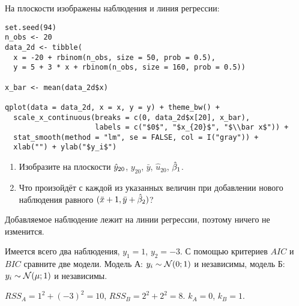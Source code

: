 \begin{problem}
На плоскости изображены наблюдения и линия регрессии:



\begin{verbatim}
set.seed(94)
n_obs <- 20
data_2d <- tibble(
  x = -20 + rbinom(n_obs, size = 50, prob = 0.5),
  y = 5 + 3 * x + rbinom(n_obs, size = 160, prob = 0.5))

x_bar <- mean(data_2d$x)

qplot(data = data_2d, x = x, y = y) + theme_bw() +
  scale_x_continuous(breaks = c(0, data_2d$x[20], x_bar),
                     labels = c("$0$", "$x_{20}$", "$\\bar x$")) +
  stat_smooth(method = "lm", se = FALSE, col = I("gray")) +
  xlab("") + ylab("$y_i$")
\end{verbatim}




\begin{minipage}{\textwidth}
\begin{tikzpicture}[scale = 0.025]

\end{tikzpicture}
\end{minipage}


\begin{enumerate}
\item Изобразите на плоскости $\hy_{20}$, $y_{20}$, $\bar y$, $\hat u_{20}$, $\hb_1$.
\item Что произойдёт с каждой из указанных величин при добавлении нового наблюдения равного $(\bar x + 1, \bar y + \hb_2)$?
\end{enumerate}
\begin{sol}
Добавляемое наблюдение лежит на линии регрессии, поэтому ничего не изменится.
\end{sol}
\end{problem}


\begin{problem}
  Имеется всего два наблюдения, $y_1 = 1$, $y_2 = -3$. С помощью критериев $AIC$ и $BIC$ сравните две модели. Модель А: $y_i \sim \cN(0; 1)$ и независимы, модель Б: $y_i \sim \cN(\mu; 1)$ и независимы.
\begin{sol}
  $RSS_A = 1^2 + (-3)^2 = 10$, $RSS_B= 2^2 + 2^2 = 8$. $k_A = 0$, $k_B=1$.
\end{sol}
\end{problem}



